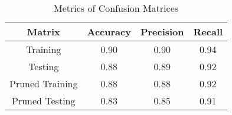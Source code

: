 \begin{table}[ht]
\caption{Metrics of Confusion Matrices}
\begin{center}
\begin{tabular}{cccc}
  \hline
	Matrix & Accuracy & Precision & Recall\\ 
  \hline
  Training & 0.90 & 0.90 & 0.94 \\ 
  Testing & 0.88 & 0.89 & 0.92 \\ 
  Pruned Training & 0.88 & 0.88 & 0.92 \\ 
  Pruned Testing & 0.83 & 0.85 & 0.91 \\ 
   \hline
\end{tabular}
\end{center}
\end{table}   
